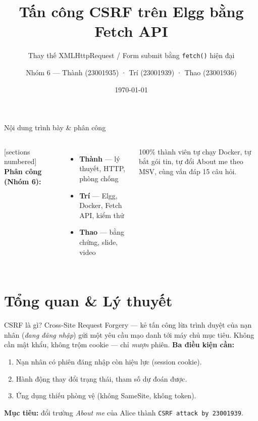 \documentclass[11pt,aspectratio=169]{beamer}
\title{Tấn công CSRF trên Elgg bằng Fetch API}
\subtitle{Thay thế XMLHttpRequest / Form submit bằng \texttt{fetch()} hiện đại}
\author{Nhóm 6 — Thành (23001935) · Trí (23001939) · Thao (23001936)}
\institute{An toàn máy tính — Trường ĐH Khoa học Tự nhiên, ĐHQGHN}
\date{\today}
\begin{document}
{
\begin{frame}[plain]\titlepage\end{frame}}

\begin{frame}{Nội dung trình bày \& phân công}
  \begin{columns}[t]
      [sections numbered]
      \tableofcontents
      \footnotesize
      \textbf{Phân công (Nhóm 6):}
      \begin{itemize}\footnotesize
        \item \textbf{Thành} — lý thuyết, HTTP, phòng chống
        \item \textbf{Trí} — Elgg, Docker, Fetch API, kiểm thử
        \item \textbf{Thao} — bằng chứng, slide, video
      \end{itemize}
      \scriptsize\color{slate} 100\% thành viên tự chạy Docker, tự bắt gói tin, tự đổi About me theo MSV, cùng vấn đáp 15 câu hỏi.
  \end{columns}
\end{frame}

\section{Tổng quan \& Lý thuyết}

\begin{frame}{CSRF là gì?}
  \alert{Cross-Site Request Forgery} — kẻ tấn công lừa trình duyệt của nạn nhân (\emph{đang đăng nhập}) gửi một yêu cầu mạo danh tới máy chủ mục tiêu. Không cần mật khẩu, không trộm cookie — chỉ \emph{mượn} phiên.
  \vfill
  \textbf{Ba điều kiện cần:}
  \begin{enumerate}
    \item Nạn nhân có phiên đăng nhập còn hiệu lực (session cookie).
    \item Hành động thay đổi trạng thái, tham số \alert{dự đoán được}.
    \item Ứng dụng \alert{thiếu phòng vệ} (không SameSite, không token).
  \end{enumerate}
  \vfill
  \footnotesize\textbf{Mục tiêu:} đổi trường \emph{About me} của Alice thành \texttt{CSRF attack by 23001939}.
\end{frame}
\end{document}
